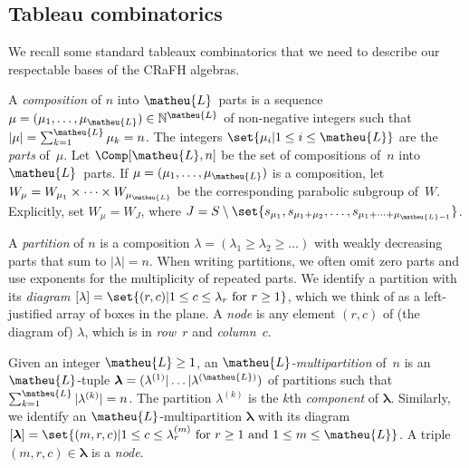 \documentclass[a4paper,11pt]{amsart}
\newcommand\blam{{\boldsymbol\lambda}}
\numberwithin{equation}{subsection}
\theoremstyle{definition}
\theoremstyle{theorem}
\theoremstyle{remark}
\newcommand\sL{\matheu{L}}
\newcommand\Sym{W}
\newcommand\N{\mathbb{N}}
\begin{document}
\subsection{Tableau combinatorics}\label{SS:Tableaux}
  We recall some standard tableaux  combinatorics that we need to describe our
  respectable bases of the CRaFH algebras.

  A \emph{composition} of $n$ into $\sL$~parts is a sequence
  $\mu=(\mu_1,\dots,\mu_{\sL})\in\N^{\sL}$ of non-negative integers such that
  $|\mu|=\sum_{k=1}^{\sL}\mu_k=n$. The integers $\set{\mu_i|1\le i\le \sL}$ are
  the \emph{parts} of~$\mu$. Let $\Comp[\sL,n]$ be the set of compositions
  of~$n$ into $\sL$~parts. If $\mu=(\mu_1,\dots,\mu_{\sL})$ is a composition,
  let $\Sym_\mu=\Sym_{\mu_1}\times\dots\times\Sym_{\mu_{\sL}}$ be the
  corresponding parabolic subgroup of~$\Sym$.  Explicitly, set
  $\Sym_\mu=\Sym_J$, where
  $J=S\setminus\set{s_{\mu_1},s_{\mu_1+\mu_2},\dots,s_{\mu_1+\dots+\mu_{\sL-1}}}$.


  A \emph{partition} of $n$ is a composition
  $\lambda=(\lambda_1\ge\lambda_2\ge\dots)$ with weakly decreasing parts
  that sum to $|\lambda|=n$. When writing partitions, we often omit zero
  parts and use exponents for the multiplicity of repeated parts. We
  identify a partition with its \emph{diagram} $[\lambda]=\set{(r,c)|1\le
  c\le \lambda_r\text{ for } r\ge1}$, which we think of as a
  left-justified array of boxes in the plane.   A \emph{node} is any element $(r,c)$ of (the diagram of)
  $\lambda$, which is in \emph{row}~$r$ and \emph{column}~$c$.

  Given an integer $\sL\ge1$, an \emph{$\sL$-multipartition} of~$n$ is an
  $\sL$-tuple $\blam=(\lambda^{(1)}|\dots|\lambda^{(\sL)})$ of
  partitions such that $\sum_{k=1}^{\sL}|\lambda^{(k)}|=n$. The
  partition $\lambda^{(k)}$ is the $k$th \emph{component} of $\blam$.
  Similarly, we identify an $\sL$-multipartition $\blam$ with its
  diagram $[\blam]=\set{(m,r,c)|1\le c\le \lambda^{(m)}_r\text{ for }
       r\ge1\text{ and }1\le m\le\sL}$. A triple $(m,r,c)\in\blam$ is a
       \emph{node}.
\end{document}
